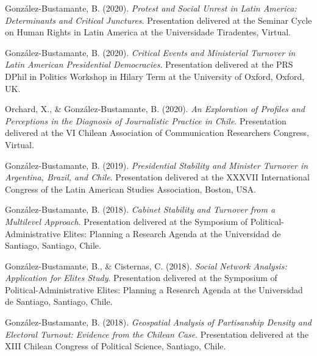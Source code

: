 \begin{publications}
\begin{benumerate}{72}
\item{\small González-Bustamante, B. (2020). {\itshape Protest and Social Unrest in Latin America: Determinants and Critical Junctures}. Presentation delivered at the Seminar Cycle on Human Rights in Latin America at the Universidade Tiradentes, Virtual.}\vspace{1mm} %

\item{\small González-Bustamante, B. (2020). {\itshape Critical Events and Ministerial Turnover in Latin American Presidential Democracies}. Presentation delivered at the PRS DPhil in Politics Workshop in Hilary Term at the University of Oxford, Oxford, UK.}\vspace{1mm}

\item{\small Orchard, X., \& González-Bustamante, B. (2020). {\itshape An Exploration of Profiles and Perceptions in the Diagnosis of Journalistic Practice in Chile}. Presentation delivered at the VI Chilean Association of Communication Researchers Congress, Virtual.}\vspace{1mm}

\item{\small González-Bustamante, B. (2019). {\itshape Presidential Stability and Minister Turnover in Argentina, Brazil, and Chile}. Presentation delivered at the XXXVII International Congress of the Latin American Studies Association, Boston, USA.}\vspace{1mm}

\item{\small González-Bustamante, B. (2018). {\itshape Cabinet Stability and Turnover from a Multilevel Approach}. Presentation delivered at the Symposium of Political-Administrative Elites: Planning a Research Agenda at the Universidad de Santiago, Santiago, Chile.}\vspace{1mm}

\item{\small González-Bustamante, B., \& Cisternas, C. (2018). {\itshape Social Network Analysis: Application for Elites Study}. Presentation delivered at the Symposium of Political-Administrative Elites: Planning a Research Agenda at the Universidad de Santiago, Santiago, Chile.}\vspace{1mm}

\item{\small González-Bustamante, B. (2018). {\itshape Geospatial Analysis of Partisanship Density and Electoral Turnout: Evidence from the Chilean Case}. Presentation delivered at the XIII Chilean Congress of Political Science, Santiago, Chile.}\vspace{1mm}


\end{benumerate}
\end{publications}
